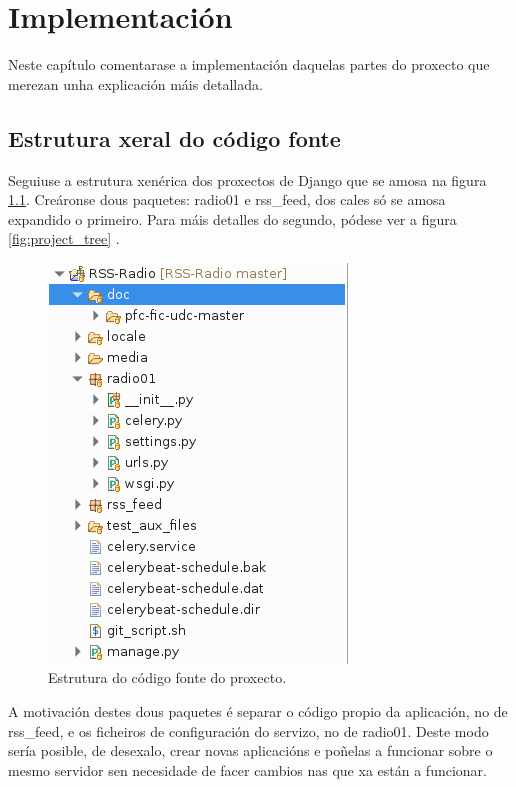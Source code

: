 \chapter[Implementación]{
  \label{chp:implementacion}
  Implementación
}
\minitoc
\newpage

Neste capítulo comentarase a implementación daquelas partes do proxecto que merezan unha explicación máis detallada.

\section{Estrutura xeral do código fonte}

Seguiuse a estrutura xenérica dos proxectos de Django que se amosa na figura \ref{fig:estrutura}. Creáronse dous paquetes: radio01 e rss\_feed, dos cales só se amosa expandido o primeiro. Para máis detalles do segundo, pódese ver a figura \ref{fig:project_tree} .

\begin{figure}[h]
	\centering
	\includegraphics[scale=0.7,keepaspectratio=true]{./images/estrutura_impl.png}
	\caption{Estrutura do código fonte do proxecto.}
	\label{fig:estrutura}
\end{figure} 


A motivación destes dous paquetes é separar o código propio da aplicación, no de rss\_feed, e os ficheiros de configuración do servizo, no de radio01. Deste modo sería posible, de desexalo, crear novas aplicacións e poñelas a funcionar sobre o mesmo servidor sen necesidade de facer cambios nas que xa están a funcionar.

